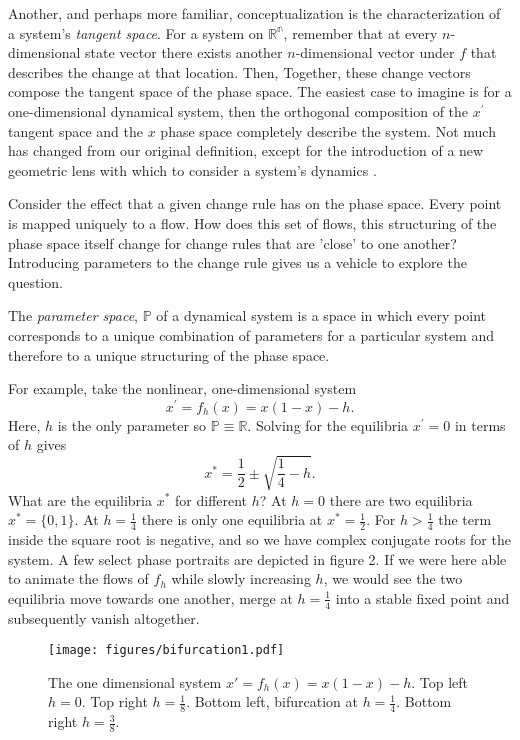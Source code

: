 \documentclass{elsart1p}
\begin{document}
Another, and perhaps more familiar, conceptualization is the 
characterization of
a system's \textit{tangent space}.  For a system on $\mathbb{R^{n}}$, remember
that at every $n$-dimensional state vector there exists another $n$-dimensional
vector under $f$ that describes the change at that location.  Then,
Together, these change vectors compose the tangent space of the phase space.
The easiest case to imagine is for a one-dimensional dynamical system, then
the orthogonal composition of the $x^{\prime}$ tangent space and the
$x$ phase space completely describe the system.  Not much has changed from
our original definition, except for the introduction of a new 
geometric lens with which to consider a system's dynamics \cite{arrowsmith}.

Consider the effect that a given change rule has on the phase space.  Every
point is mapped uniquely to a flow.  How does this
set of flows, this structuring of the phase space itself change for change
rules that are 'close' to one another?  Introducing parameters to the change
rule gives us a vehicle to explore the question.

The \textit{parameter space}, $\mathbb{P}$ of a dynamical system is a space in
which every point corresponds to a unique combination of parameters for a
particular system and therefore to a unique structuring of the phase space.

For example, take the nonlinear, one-dimensional system 
$$x^{\prime} = f_{h}(x) = x(1-x)-h.$$  Here, $h$
is the only parameter so $\mathbb{P} \equiv \mathbb{R}$.  Solving for the
equilibria $x^{\prime} = 0$ in terms of $h$ gives $$x^{*}=\frac{1}{2} \pm \sqrt{\frac{1}{4} - h}.$$
What are the equilibria $x^{*}$ for different $h$?  At $h=0$ there are two equilibria $x^{*}=\{0,1\}$.  At $h=\frac{1}{4}$ there is only one equilibria at $x^{*}=\frac{1}{2}$.  For 
$h > \frac{1}{4}$ the term inside the square root is negative, and so we have complex conjugate roots for the system.  A few select phase portraits are depicted in figure 2.  If we were here able to animate the flows of $f_{h}$ while slowly increasing $h$, we would see the two equilibria move towards one another, merge at $h=\frac{1}{4}$ into a stable fixed point and subsequently vanish altogether.


\begin{figure}[htp]
\centering
\texttt{[image: figures/bifurcation1.pdf]}
\caption{The one dimensional system $x\prime = f_{h}(x) = x(1-x)-h$.
Top left $h=0$.  Top right $h=\frac{1}{8}$.
Bottom left, bifurcation at $h=\frac{1}{4}$.
Bottom right $h=\frac{3}{8}$.} 
\label{fig:bifurc}
\end{figure}
\end{document}
